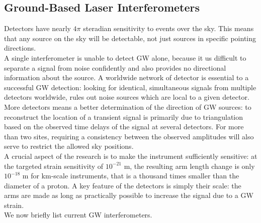 \documentclass[binding=0.6cm, LaM]{sapthesis}
\begin{document}
\subsection{Ground-Based Laser Interferometers}

	Detectors have nearly $4\pi$ steradian sensitivity to events over the sky. 
	This means that any source on the sky will be detectable,
        not just sources in specific pointing directions. \\
	A single interferometer is unable to detect GW alone,
	because it us difficult to separate a signal from noise confidently 
	and also provides no directional information about the source.
	A worldwide network of detector is essential to a successful GW detection:
	looking for identical, simultaneous signals from multiple detectors worldwide, 
	rules out noise sources which are local to a given detector. 
	More detectors means a better determination of the direction of GW sources: 
	to reconstruct the location of a transient signal is primarily due to triangulation 
	based on the observed time delays of the signal at several detectors. 
	For more than two sites, requiring a consistency between the observed amplitudes 
	will also serve to restrict the allowed sky positions\cite{12}. \\
	A crucial aspect of the research is to make the instrument sufficiently sensitive:
        at the targeted strain sensitivity of $10^{−21}$ m, the resulting arm length change is only $ 10^{-18}$ m for km-scale instruments, that is
        a thousand times smaller than the diameter of a proton.
        A key feature of the detectors is simply their scale:
        the arms are made as long as practically possible to increase the signal due to a GW strain. \\
	We now briefly list current GW interferometers.
\end{document}

